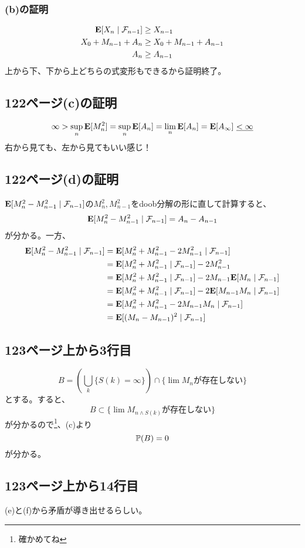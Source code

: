     \subsubsection{(b)の証明}
      \begin{align*}
        {\mathbf{E}}[X_n \mid \mathcal{F}_{n-1}] &\ge X_{n-1}\\
        X_0 + M_{n-1} + A_n &\ge X_0 + M_{n-1} + A_{n-1}\\
        A_n &\ge A_{n-1}
      \end{align*}
      上から下、下から上どちらの式変形もできるから証明終了。

  \subsection{122ページ(c)の証明}
    \[\infty > \sup_n {\mathbf{E}}[M_n^2] = \sup_n {\mathbf{E}}[A_n] = \lim_n {\mathbf{E}}[A_n] = {\mathbf{E}}[A_{\infty}]\,\,\underline{< \infty}\]
    右から見ても、左から見てもいい感じ！

  \subsection{122ページ(d)の証明}
    ${\mathbf{E}}[M_n^2 - M_{n-1}^2 \mid \mathcal{F}_{n-1}]$の$M_n^2,M_{n-1}^2$をdoob分解の形に直して計算すると、
    \[{\mathbf{E}}[M_n^2 - M_{n-1}^2 \mid \mathcal{F}_{n-1}]  = A_n - A_{n-1}\]
    が分かる。一方、
    \begin{align*}
      {\mathbf{E}}[M_n^2 - M_{n-1}^2 \mid \mathcal{F}_{n-1}] &= {\mathbf{E}}[M_n^2 + M_{n-1}^2 - 2M_{n-1}^2 \mid \mathcal{F}_{n-1}]\\
      &= {\mathbf{E}}[M_n^2 + M_{n-1}^2 \mid \mathcal{F}_{n-1}] - 2M_{n-1}^2 \\
      &= {\mathbf{E}}[M_n^2 + M_{n-1}^2 \mid \mathcal{F}_{n-1}] - 2M_{n-1}{\mathbf{E}}[M_{n} \mid \mathcal{F}_{n-1}] \\
      &= {\mathbf{E}}[M_n^2 + M_{n-1}^2 \mid \mathcal{F}_{n-1}] - 2{\mathbf{E}}[M_{n-1}M_{n} \mid \mathcal{F}_{n-1}] \\
      &= {\mathbf{E}}[M_n^2 + M_{n-1}^2 - 2M_{n-1}M_{n} \mid \mathcal{F}_{n-1}]\\
      &= {\mathbf{E}}[(M_n - M_{n-1})^2 \mid \mathcal{F}_{n-1}]
    \end{align*}

  \subsection{123ページ上から3行目}
    \[B = \left( \bigcup_k \{S(k) = \infty\} \right) \cap \{\lim M_n \text{が存在しない}\}\]
    とする。すると、
    \[B \subset \{\lim M_{n \wedge S(k)} \text{が存在しない}\}\]
    が分かるので\footnote{確かめてね}、(c)より
    \[{\mathbb{P}}(B) = 0\]
    が分かる。

  \subsection{123ページ上から14行目}
    (e)と(f)から矛盾が導き出せるらしい。

    
